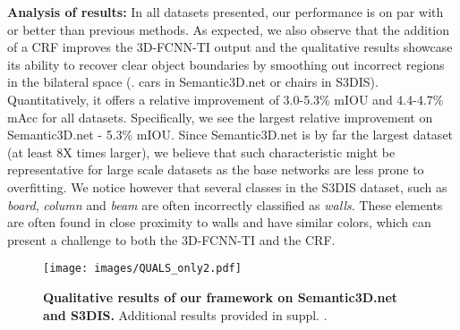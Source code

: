 \documentclass[10pt,twocolumn,letterpaper]{article}
\newcommand{\fccrf}[0]{CRF\xspace}
\newcommand{\threedfcnn}[0]{3D-FCNN\xspace}
\begin{document}
\textbf{Analysis of results: } In all datasets presented, our performance is on par with or better than previous methods. As expected, we also observe that the addition of a \fccrf improves the \threedfcnn-TI output and the qualitative results showcase its ability to recover clear object boundaries by smoothing out incorrect regions in the bilateral space (\eg. cars in Semantic3D.net or chairs in S3DIS). Quantitatively, it offers a relative  improvement of 3.0-5.3\% mIOU and 4.4-4.7\% mAcc for all datasets. Specifically, we see the largest relative improvement on Semantic3D.net - 5.3\% mIOU. Since Semantic3D.net is by far the largest dataset (at least 8X times larger), we believe that such characteristic might be representative for large scale datasets as the base networks are less prone to overfitting. We notice however that several classes in the S3DIS dataset, such as \textit{board}, \textit{column} and \textit{beam} are often incorrectly classified as \textit{walls}. These elements are often found in close proximity to walls and have similar colors, which can present a challenge to both the \threedfcnn-TI and the \fccrf.  
\begin{figure*}
\centering
\vspace{-4mm}

\texttt{[image: images/QUALS\_only2.pdf]}
\caption{\small{\textbf{Qualitative results of our framework on Semantic3D.net and S3DIS.} Additional results provided in suppl. \cite{segcloudsuppl}.}}
\label{fig:qualitative}
\end{figure*} 
\end{document}
